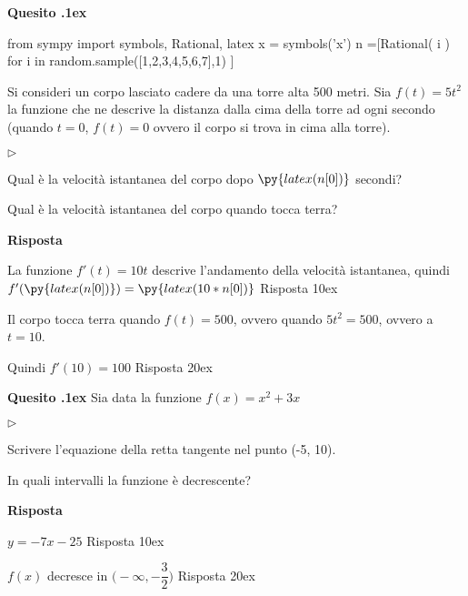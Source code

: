 \documentclass[11pt,twoside,a4paper]{article}
\newcommand{\mylabel}[1]{#1\hfill}
\renewenvironment{itemize}
  {\begin{list}{$\triangleright$}{%
   \setlength{\parskip}{0mm}
   \setlength{\topsep}{.4\baselineskip}
   \setlength{\rightmargin}{0mm}
   \setlength{\listparindent}{0mm}
   \setlength{\itemindent}{0mm}
   \setlength{\labelwidth}{2ex}
   \setlength{\itemsep}{.4\baselineskip}
   \setlength{\parsep}{0mm}
   \setlength{\partopsep}{0mm}
   \setlength{\labelsep}{1ex}
   \setlength{\leftmargin}{\labelwidth+\labelsep}
   \let\makelabel\mylabel}}{%
   \end{list}\vspace*{-1.3mm}}
\newcounter{quesito}
\newenvironment{question}{\bigskip\addtocounter{quesito}{1}\bigskip\bigskip\par\textbf{Quesito \thequesito.\kern1ex}}{\vspace{\parskip}}
\newenvironment{answer}{\par\textbf{Risposta\quad}}{\vspace{\parskip}}
\begin{document}
\begin{question}
\begin{pycode}
from sympy import symbols, Rational, latex
x = symbols('x')
n =[Rational( i ) for i in random.sample([1,2,3,4,5,6,7],1) ]
\end{pycode}
Si consideri un corpo lasciato cadere da una torre alta 500 metri. Sia  $f(t) = 5 t^2$ la funzione che ne descrive la distanza dalla cima della torre ad ogni secondo (quando $t=0$, $f(t) = 0$ ovvero il corpo si trova in cima alla torre).
\begin{itemize}
\item[1.] Qual è la velocità istantanea del corpo dopo $\py{latex(n[0])}$ secondi?
\item[2.] Qual è la velocità istantanea del corpo quando tocca terra?
\end{itemize}
\begin{answer}

La funzione $f'(t) = 10 t$ descrive l'andamento della velocità istantanea, quindi
{\color{blue}
$f'(\py{latex(n[0])}) = \py{latex(10*n[0])}$
\hfill Risposta 1\kern0ex}

Il corpo tocca terra quando $f(t) = 500$, ovvero quando $5t^2 = 500$, ovvero a $t = 10$.

Quindi
{\color{blue}
$f'(10) = 100$
\hfill Risposta 2\kern0ex}

\end{answer}
\end{question}
\begin{question}
Sia data la funzione $f(x) = x^2 + 3 x$
\begin{itemize}
\item[1.] Scrivere l'equazione della retta tangente nel punto (-5, 10).
\item[2.] In quali intervalli la funzione è decrescente?
\end{itemize}
\begin{answer}

{\color{blue}
$y = -7x -25$
\hfill Risposta 1\kern0ex}

{\color{blue}
$f(x)$ decresce in $\bigg(-\infty, -\dfrac{3}{2}\bigg)$
\hfill Risposta 2\kern0ex}

\end{answer}
\end{question}
\end{document}
